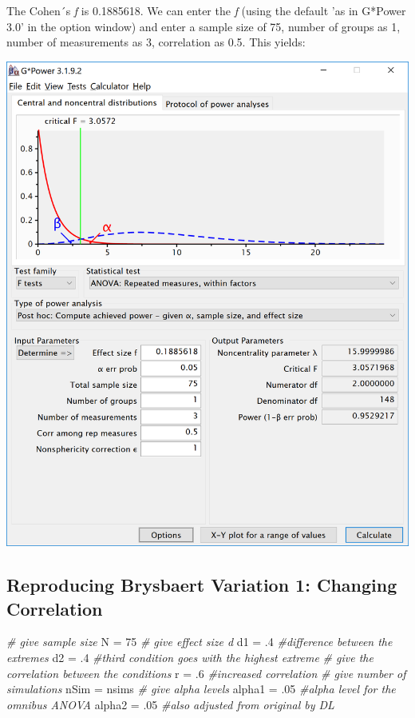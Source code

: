 \documentclass[
]{book}
\newenvironment{Shaded}{\begin{snugshade}}{\end{snugshade}}
\newcommand{\CommentTok}[1]{\textcolor[rgb]{0.56,0.35,0.01}{\textit{#1}}}
\newcommand{\DecValTok}[1]{\textcolor[rgb]{0.00,0.00,0.81}{#1}}
\newcommand{\FloatTok}[1]{\textcolor[rgb]{0.00,0.00,0.81}{#1}}
\newcommand{\NormalTok}[1]{#1}
\newcommand{\StringTok}[1]{\textcolor[rgb]{0.31,0.60,0.02}{#1}}
\begin{document}
The Cohen´s \emph{f} is 0.1885618. We can enter the \emph{f} (using the default 'as in G*Power 3.0' in the option window) and enter a sample size of 75, number of groups as 1, number of measurements as 3, correlation as 0.5. This yields:

\includegraphics{screenshots/gpower_3.png}

\hypertarget{reproducing-brysbaert-variation-1-changing-correlation}{%
\subsection{Reproducing Brysbaert Variation 1: Changing Correlation}\label{reproducing-brysbaert-variation-1-changing-correlation}}

\begin{Shaded}
\begin{Highlighting}[]
\CommentTok{# give sample size}
\NormalTok{N =}\StringTok{ }\DecValTok{75}
\CommentTok{# give effect size d}
\NormalTok{d1 =}\StringTok{ }\FloatTok{.4} \CommentTok{#difference between the extremes}
\NormalTok{d2 =}\StringTok{ }\FloatTok{.4} \CommentTok{#third condition goes with the highest extreme}
\CommentTok{# give the correlation between the conditions}
\NormalTok{r =}\StringTok{ }\FloatTok{.6} \CommentTok{#increased correlation}
\CommentTok{# give number of simulations}
\NormalTok{nSim =}\StringTok{ }\NormalTok{nsims}
\CommentTok{# give alpha levels}
\NormalTok{alpha1 =}\StringTok{ }\FloatTok{.05} \CommentTok{#alpha level for the omnibus ANOVA}
\NormalTok{alpha2 =}\StringTok{ }\FloatTok{.05} \CommentTok{#also adjusted from original by DL}
\end{Highlighting}
\end{Shaded}
\end{document}
